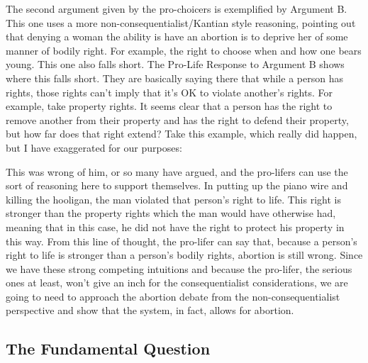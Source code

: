 The second argument given by the pro-choicers is exemplified by Argument B. This one uses a more non-consequentialist/Kantian style reasoning, pointing out that denying a woman the ability is have an abortion is to deprive her of some manner of bodily right. For example, the right to choose when and how one bears young. This one also falls short. The Pro-Life Response to Argument B shows where this falls short. They are basically saying there that while a person has rights, those rights can't imply that it's OK to violate another's rights. For example, take property rights. It seems clear that a person has the right to remove another from their property and has the right to defend their property, but how far does that right extend? Take this example, which really did happen, but I have exaggerated for our purposes:


This was wrong of him, or so many have argued, and the pro-lifers can use the sort of reasoning here to support themselves. In putting up the piano wire and killing the hooligan, the man violated that person's right to life. This right is stronger than the property rights which the man would have otherwise had, meaning that in this case, he did not have the right to protect his property in this way.  From this line of thought, the pro-lifer can say that, because a person's right to life is stronger than a person's bodily rights, abortion is still wrong.  Since we have these strong competing intuitions and because the pro-lifer, the serious ones at least, won't give an inch for the consequentialist considerations, we are going to need to approach the abortion debate from the non-consequentialist perspective and show that the system, in fact, allows for abortion.
\subsection{The Fundamental Question}

